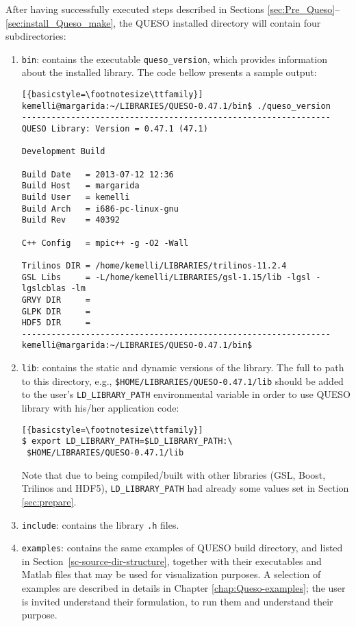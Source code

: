 After having successfully executed steps described in Sections \ref{sec:Pre_Queso}--\ref{sec:install_Queso_make}, the QUESO installed directory will contain four subdirectories:
\begin{enumerate}
 \item \verb+bin+: contains the executable \verb+queso_version+, which provides information about the installed library. The code bellow presents a sample output:

\begin{lstlisting}[{basicstyle=\footnotesize\ttfamily}]
kemelli@margarida:~/LIBRARIES/QUESO-0.47.1/bin$ ./queso_version 
---------------------------------------------------------------
QUESO Library: Version = 0.47.1 (47.1)

Development Build

Build Date   = 2013-07-12 12:36
Build Host   = margarida
Build User   = kemelli
Build Arch   = i686-pc-linux-gnu
Build Rev    = 40392

C++ Config   = mpic++ -g -O2 -Wall

Trilinos DIR = /home/kemelli/LIBRARIES/trilinos-11.2.4
GSL Libs     = -L/home/kemelli/LIBRARIES/gsl-1.15/lib -lgsl -lgslcblas -lm
GRVY DIR     = 
GLPK DIR     = 
HDF5 DIR     = 
---------------------------------------------------------------
kemelli@margarida:~/LIBRARIES/QUESO-0.47.1/bin$ 
\end{lstlisting}

 \item \verb+lib+: contains the static and dynamic versions of the library. The full to path to this directory, e.g., \verb+$HOME/LIBRARIES/QUESO-0.47.1/lib+ should be added to the user's \verb+LD_LIBRARY_PATH+ environmental variable in order to use QUESO library with his/her application code:
\begin{lstlisting}[{basicstyle=\footnotesize\ttfamily}]
$ export LD_LIBRARY_PATH=$LD_LIBRARY_PATH:\
 $HOME/LIBRARIES/QUESO-0.47.1/lib
\end{lstlisting}


Note that due to \Queso{} being compiled/built with other libraries (GSL, Boost, Trilinos and HDF5), \verb+LD_LIBRARY_PATH+ had already some values set in Section \ref{sec:prepare}.


 \item \verb+include+: contains the library \verb+.h+ files.

 \item \verb+examples+: contains the same examples of QUESO build directory, and listed in Section~\ref{sc-source-dir-structure}, together with their executables and Matlab files that may be used for visualization purposes. A selection of examples are described in details in Chapter \ref{chap:Queso-examples}; the user is invited understand their formulation, to run them and understand their purpose. 


\end{enumerate}




